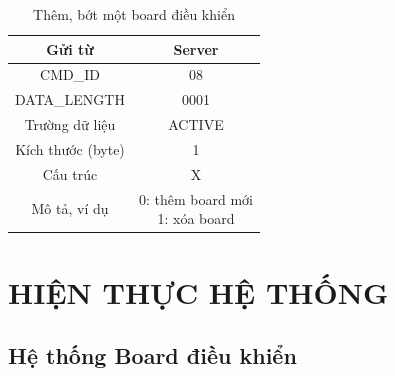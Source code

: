 \documentclass[a4paper,12pt,oneside]{article}
\begin{document}
\begin{table}[!htp]
\centering
\begin{tabular}{|c|c|}
\hline 
Gửi từ & Server \\ 
\hline 
CMD\_ID & 08 \\ 
\hline 
DATA\_LENGTH & 0001 \\ 
\hline 
Trường dữ liệu & ACTIVE \\ 
\hline 
Kích thước (byte) & 1 \\ 
\hline 
Cấu trúc & X \\ 
\hline 
Mô tả, ví dụ & \makecell{0: thêm board mới \\ 1: xóa board} \\ 
\hline 
\end{tabular} 
\caption{Thêm, bớt một board điều khiển}
\end{table}

\newpage
\section{HIỆN THỰC HỆ THỐNG}

\subsection{Hệ thống Board điều khiển}
\end{document}
